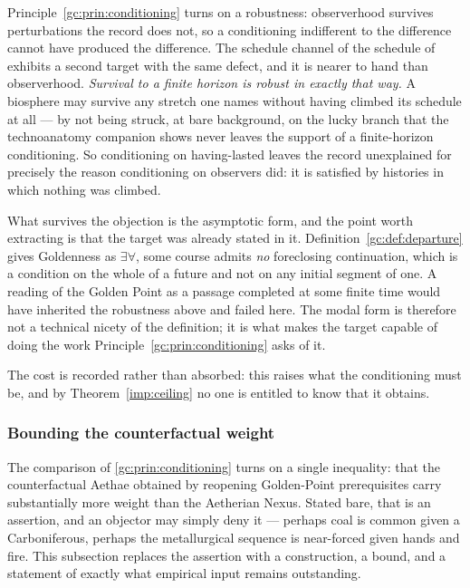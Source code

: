 \begin{remark}\label{gc:rem:finitehorizon}
Principle~\ref{gc:prin:conditioning} turns on a robustness: observerhood
survives perturbations the record does not, so a conditioning
indifferent to the difference cannot have produced the difference. The
schedule channel of the schedule of \cite{GoldenTechnoanatomy} exhibits a second target
with the same defect, and it is nearer to hand than observerhood. \emph{Survival to a finite horizon is robust in exactly that way.} A
biosphere may survive any stretch one names without having climbed its
schedule at all --- by not being struck, at bare background, on the
lucky branch that the technoanatomy companion \cite{GoldenTechnoanatomy} shows never leaves the
support of a finite-horizon conditioning. So conditioning on
having-lasted leaves the record unexplained for precisely the reason
conditioning on observers did: it is satisfied by histories in which
nothing was climbed.

What survives the objection is the asymptotic form, and the point worth
extracting is that the target was already stated in it.
Definition~\ref{gc:def:departure} gives Goldenness as $\exists\forall$, some course admits \emph{no} foreclosing continuation, which is a
condition on the whole of a future and not on any initial segment of
one. A reading of the Golden Point as a passage completed at some finite
time would have inherited the robustness above and failed here. The
modal form is therefore not a technical nicety of the definition; it is
what makes the target capable of doing the work
Principle~\ref{gc:prin:conditioning} asks of it.

The cost is recorded rather than absorbed: this raises what the
conditioning must be, and by Theorem~\ref{imp:ceiling} no one is entitled
to know that it obtains.
\end{remark}

\subsubsection{Bounding the counterfactual weight}
\label{gc:subsub:weightbound}

The comparison of \ref{gc:prin:conditioning} turns on a single inequality:
that the counterfactual Aethae obtained by reopening Golden-Point
prerequisites carry substantially more weight than the Aetherian Nexus.
Stated bare, that is an assertion, and an objector may simply deny it ---
perhaps coal is common given a Carboniferous, perhaps the metallurgical
sequence is near-forced given hands and fire. This subsection replaces
the assertion with a construction, a bound, and a statement of exactly
what empirical input remains outstanding.

